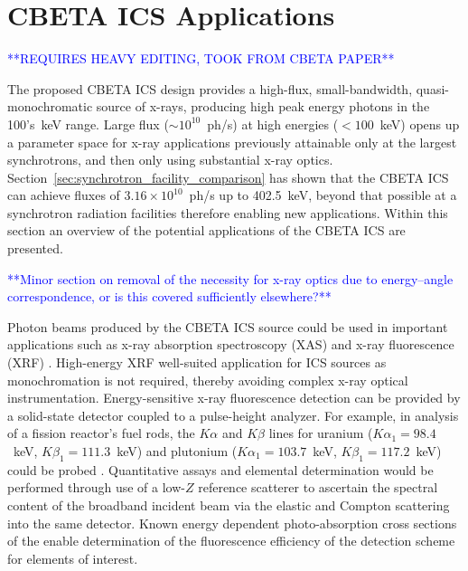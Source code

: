 \documentclass[../main.tex]{subfiles}
\begin{document}
\section{CBETA ICS Applications}
\label{sec:CBETA_ICS_applications}
\textcolor{blue}{**REQUIRES HEAVY EDITING, TOOK FROM CBETA PAPER** }

The proposed CBETA ICS design provides a high-flux, small-bandwidth, quasi-monochromatic source of x-rays, producing high peak energy photons in the 100's~\si{\kilo\electronvolt} range. Large flux ($\sim 10^{10}$~ph/\si{\second}) at high energies ($< 100$~\si{\kilo\electronvolt}) opens up a parameter space for x-ray applications previously attainable only at the largest synchrotrons, and then only using substantial x-ray optics. Section~\ref{sec:synchrotron_facility_comparison} has shown that the CBETA ICS can achieve fluxes of $3.16\times 10^{10}$~ph/\si{\second} up to 402.5~\si{\kilo\electronvolt}, beyond that possible at a synchrotron radiation facilities therefore enabling new applications. Within this section an overview of the potential applications of the CBETA ICS are presented.   

\textcolor{blue}{**Minor section on removal of the necessity for x-ray optics due to energy--angle correspondence, or is this covered sufficiently elsewhere?**}

Photon beams produced by the CBETA ICS source could be used in important applications such as x-ray absorption spectroscopy (XAS) and x-ray fluorescence (XRF) \cite{willmott2019introduction}. High-energy XRF well-suited application for ICS sources as monochromation is not required, thereby avoiding complex x-ray optical instrumentation. Energy-sensitive x-ray fluorescence detection can be provided by a solid-state detector coupled to a pulse-height analyzer. For example, in analysis of a fission reactor's fuel rods, the $K\alpha$ and $K\beta$ lines for uranium ($K\alpha_{1} = 98.4$~\si{\kilo\electronvolt}, $K\beta_{1} = 111.3$~\si{\kilo\electronvolt}) and plutonium ($K\alpha_{1} = 103.7$~\si{\kilo\electronvolt}, $K\beta_{1} = 117.2$~\si{\kilo\electronvolt}) could be probed \cite{havrilla2015feasibility}. Quantitative assays and elemental determination would be performed through use of a low-$Z$ reference scatterer to ascertain the spectral content of the broadband incident beam via the elastic and Compton scattering into the same detector. Known energy dependent photo-absorption cross sections of the enable determination of the fluorescence efficiency of the detection scheme for elements of interest.
\end{document}
